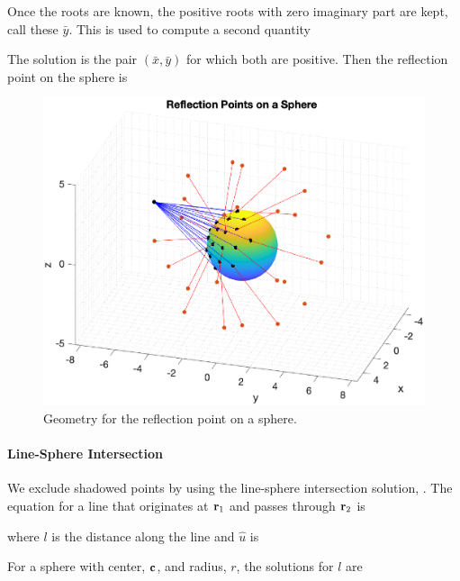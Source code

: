 Once the roots are known, the positive roots with zero imaginary part are kept, call these $\bar{y}$. This is used to compute a second quantity

The solution is the pair $(\bar{x},\bar{y})$ for which both are positive. Then the reflection point on the sphere is 

\begin{figure}[h] 
   \centering
   \includegraphics[width=4.5in]{ReflectionRefraction/Figures/reflectonraysphere} 
   \caption{Geometry for the reflection point on a sphere.}
\end{figure}

\paragraph{Line-Sphere Intersection} 

We exclude shadowed points by using the line-sphere intersection solution, \cite{linesphereintersect}. The equation for a line that originates at $\mathbf{r}_1$ and passes through $\mathbf{r}_2$ is

\noindent where $l$ is the distance along the line and $\hat{u}$ is

For a sphere with center, $\mathbf{c}$, and radius, $r$, the solutions for $l$ are

